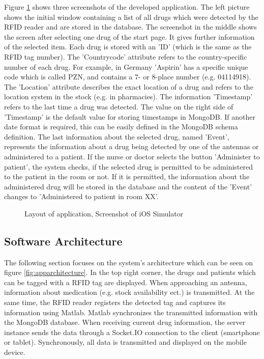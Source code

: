 Figure \ref{fig:app_screenshot} shows three screenshots of the developed application. The left picture shows the initial window containing a list of all drugs which were detected by the RFID reader and are stored in the database. The screenshot in the middle shows the screen after selecting one drug of the start page. It gives further information of the selected item. Each drug is stored with an 'ID' (which is the same as the RFID tag number). The 'Countrycode' attribute refers to the country-specific number of each drug. For example, in Germany 'Aspirin' has a specific unique code which is called \ac{PZN}, and contains a 7- or 8-place number (e.g. 04114918). The 'Location' attribute describes the exact location of a drug and refers to the location system in the stock (e.g. in pharmacies). The information 'Timestamp' refers to the last time a drug was detected. The value on the right side of 'Timestamp' is the default value for storing timestamps in MongoDB. If another date format is required, this can be easily defined in the MongoDB schema definition. The last information about the selected drug, named 'Event', represents the information about a drug being detected by one of the antennas or administered to a patient. If the nurse or doctor selects the button 'Administer to patient', the system checks, if the selected drug is permitted to be administered to the patient in the room or not. If it is permitted, the information about the administered drug will be stored in the database and the content of the 'Event' changes to 'Administered to patient in room XX'.

\begin{figure}
\centering
{}
\caption{\label{fig:app_screenshot}Layout of application, Screenshot of iOS Simulator}
\end{figure}

\subsection{Software Architecture} \label{section_architecture}

The following section focuses on the system's architecture which can be seen on figure \ref{fig:apparchitecture}. In the top right corner, the drugs and patients which can be tagged with a RFID tag are displayed. When approaching an antenna, information about medication (e.g. stock availability ect.) is transmitted. At the same time, the RFID reader registers the detected tag and captures its information using Matlab. Matlab synchronizes the transmitted information with the MongoDB database. When receiving current drug information, the server instance sends the data through a Socket.IO connection to the client (smartphone or tablet). Synchronously, all data is transmitted and displayed on the mobile device.

